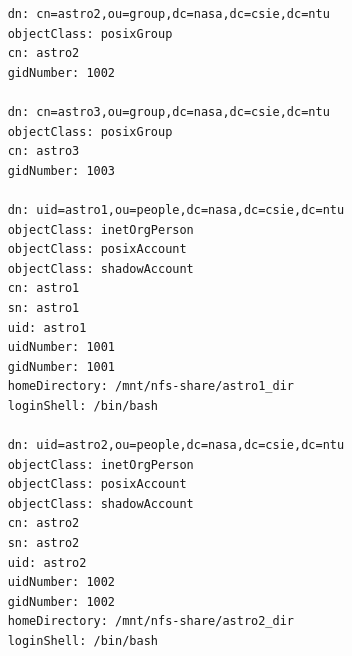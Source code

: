 \documentclass[12pt]{article}
\begin{document}
\begin{enumerate}
\begin{verbatim}
    dn: cn=astro2,ou=group,dc=nasa,dc=csie,dc=ntu
    objectClass: posixGroup
    cn: astro2
    gidNumber: 1002

    dn: cn=astro3,ou=group,dc=nasa,dc=csie,dc=ntu
    objectClass: posixGroup
    cn: astro3
    gidNumber: 1003

    dn: uid=astro1,ou=people,dc=nasa,dc=csie,dc=ntu
    objectClass: inetOrgPerson
    objectClass: posixAccount
    objectClass: shadowAccount
    cn: astro1
    sn: astro1
    uid: astro1
    uidNumber: 1001
    gidNumber: 1001
    homeDirectory: /mnt/nfs-share/astro1_dir
    loginShell: /bin/bash

    dn: uid=astro2,ou=people,dc=nasa,dc=csie,dc=ntu
    objectClass: inetOrgPerson
    objectClass: posixAccount
    objectClass: shadowAccount
    cn: astro2
    sn: astro2
    uid: astro2
    uidNumber: 1002
    gidNumber: 1002
    homeDirectory: /mnt/nfs-share/astro2_dir
    loginShell: /bin/bash


\end{verbatim}
\end{enumerate}
\end{document}
